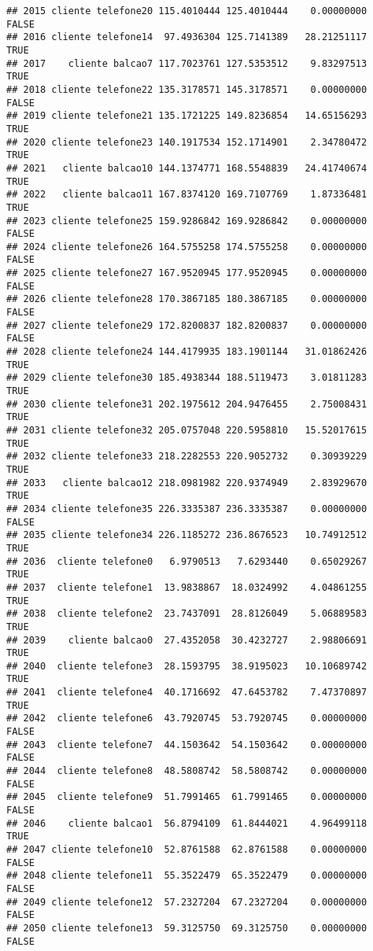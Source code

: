 \documentclass[
]{article}
\begin{document}
\begin{verbatim}
## 2015 cliente telefone20 115.4010444 125.4010444    0.00000000    FALSE
## 2016 cliente telefone14  97.4936304 125.7141389   28.21251117     TRUE
## 2017    cliente balcao7 117.7023761 127.5353512    9.83297513     TRUE
## 2018 cliente telefone22 135.3178571 145.3178571    0.00000000    FALSE
## 2019 cliente telefone21 135.1721225 149.8236854   14.65156293     TRUE
## 2020 cliente telefone23 140.1917534 152.1714901    2.34780472     TRUE
## 2021   cliente balcao10 144.1374771 168.5548839   24.41740674     TRUE
## 2022   cliente balcao11 167.8374120 169.7107769    1.87336481     TRUE
## 2023 cliente telefone25 159.9286842 169.9286842    0.00000000    FALSE
## 2024 cliente telefone26 164.5755258 174.5755258    0.00000000    FALSE
## 2025 cliente telefone27 167.9520945 177.9520945    0.00000000    FALSE
## 2026 cliente telefone28 170.3867185 180.3867185    0.00000000    FALSE
## 2027 cliente telefone29 172.8200837 182.8200837    0.00000000    FALSE
## 2028 cliente telefone24 144.4179935 183.1901144   31.01862426     TRUE
## 2029 cliente telefone30 185.4938344 188.5119473    3.01811283     TRUE
## 2030 cliente telefone31 202.1975612 204.9476455    2.75008431     TRUE
## 2031 cliente telefone32 205.0757048 220.5958810   15.52017615     TRUE
## 2032 cliente telefone33 218.2282553 220.9052732    0.30939229     TRUE
## 2033   cliente balcao12 218.0981982 220.9374949    2.83929670     TRUE
## 2034 cliente telefone35 226.3335387 236.3335387    0.00000000    FALSE
## 2035 cliente telefone34 226.1185272 236.8676523   10.74912512     TRUE
## 2036  cliente telefone0   6.9790513   7.6293440    0.65029267     TRUE
## 2037  cliente telefone1  13.9838867  18.0324992    4.04861255     TRUE
## 2038  cliente telefone2  23.7437091  28.8126049    5.06889583     TRUE
## 2039    cliente balcao0  27.4352058  30.4232727    2.98806691     TRUE
## 2040  cliente telefone3  28.1593795  38.9195023   10.10689742     TRUE
## 2041  cliente telefone4  40.1716692  47.6453782    7.47370897     TRUE
## 2042  cliente telefone6  43.7920745  53.7920745    0.00000000    FALSE
## 2043  cliente telefone7  44.1503642  54.1503642    0.00000000    FALSE
## 2044  cliente telefone8  48.5808742  58.5808742    0.00000000    FALSE
## 2045  cliente telefone9  51.7991465  61.7991465    0.00000000    FALSE
## 2046    cliente balcao1  56.8794109  61.8444021    4.96499118     TRUE
## 2047 cliente telefone10  52.8761588  62.8761588    0.00000000    FALSE
## 2048 cliente telefone11  55.3522479  65.3522479    0.00000000    FALSE
## 2049 cliente telefone12  57.2327204  67.2327204    0.00000000    FALSE
## 2050 cliente telefone13  59.3125750  69.3125750    0.00000000    FALSE

\end{verbatim}
\end{document}

